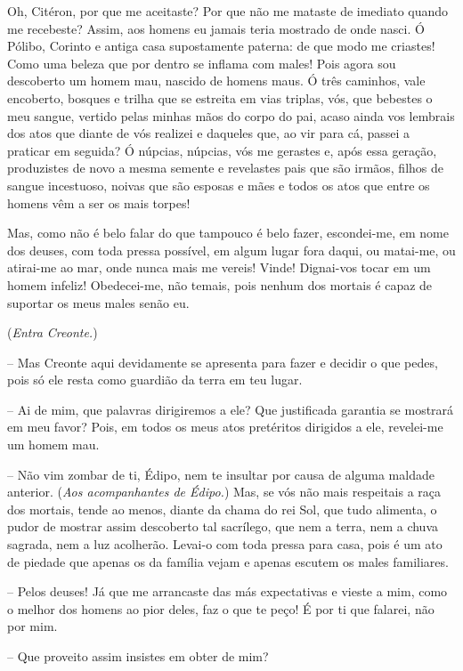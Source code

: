 Oh, Citéron, por que me aceitaste? Por que não me mataste de imediato
quando me recebeste? Assim, aos homens eu jamais teria mostrado de onde
nasci. Ó Pólibo, Corinto e antiga casa supostamente paterna: de que modo
me criastes! Como uma beleza que por dentro se inflama com males! Pois
agora sou descoberto um homem mau, nascido de homens maus. Ó três
caminhos, vale encoberto, bosques e trilha que  se estreita em
vias triplas, vós, que bebestes o meu sangue, vertido pelas minhas mãos
do corpo do pai, acaso ainda vos lembrais dos atos que diante de vós
realizei e daqueles que, ao vir para cá, passei a praticar em seguida? Ó
núpcias, núpcias, vós me gerastes e, após essa geração, produzistes de
novo a mesma semente e revelastes pais que são irmãos, filhos de sangue
incestuoso, noivas que são esposas e mães e todos os atos que entre os
homens vêm a ser os mais torpes!

Mas, como não é belo falar do que tampouco é belo fazer, escondei-me, em
 nome dos deuses, com toda pressa possível, em algum lugar fora
daqui, ou matai-me, ou atirai-me ao mar, onde nunca mais me vereis!
Vinde! Dignai-vos tocar em um homem infeliz! Obedecei-me, não temais,
pois nenhum dos mortais é capaz de suportar os meus males senão eu.

(\emph{Entra Creonte.})

 --   Mas Creonte aqui devidamente se apresenta para fazer e decidir o que
pedes, pois só ele resta como guardião da terra em teu lugar.

 --    Ai de mim, que palavras dirigiremos a ele? Que justificada
garantia se mostrará em meu favor? Pois, em todos os meus atos
pretéritos dirigidos a ele, revelei-me um homem mau.

 --   Não vim zombar de ti, Édipo, nem te insultar por causa de alguma maldade
anterior. (\emph{Aos acompanhantes de Édipo.}) Mas, se vós não mais
respeitais a raça dos mortais, tende ao menos, diante da chama do rei
Sol, que tudo alimenta, o pudor de mostrar assim descoberto tal
sacrílego, que nem a terra, nem a chuva sagrada, nem a luz acolherão.
Levai-o com toda pressa  para casa, pois é um ato de piedade que
apenas os da família vejam e apenas escutem os males familiares.

 --   Pelos deuses! Já que me arrancaste das más expectativas e vieste a mim,
como o melhor dos homens ao pior deles, faz o que te peço! É por ti que
falarei, não por mim.

 --   Que proveito assim insistes em obter de mim?

